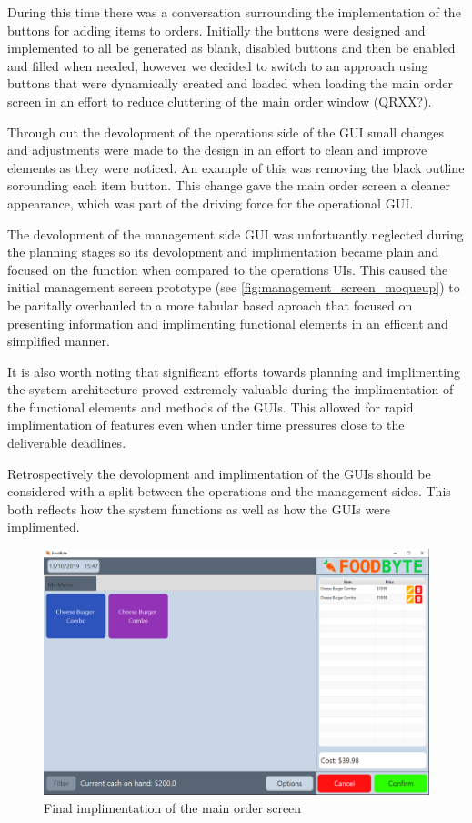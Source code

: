 During this time there was a conversation surrounding the implementation of the buttons for adding items to orders. Initially the buttons were designed and implemented to all be generated as blank, disabled buttons and then be enabled and filled when needed, however we decided to switch to an approach using buttons that were dynamically created and loaded when loading the main order screen in an effort to reduce cluttering of the main order window (QRXX?).

Through out the devolopment of the operations side of the GUI small changes and adjustments were made to the design in an effort to clean and improve elements as they were noticed. An example of this was removing the black outline sorounding each item button. This change gave the main order screen a cleaner appearance, which was part of the driving force for the operational GUI.

The devolopment of the management side GUI was unfortuantly neglected during the planning stages so its devolopment and implimentation became plain and focused on the function when compared to the operations UIs. This caused the initial management screen prototype (see \ref{fig:management_screen_moqueup}) to be paritally overhauled to a more tabular based aproach that focused on presenting information and implimenting functional elements in an efficent and simplified manner.

It is also worth noting that significant efforts towards planning and implimenting the system architecture proved extremely valuable during the implimentation of the functional elements and methods of the GUIs. This allowed for rapid implimentation of features even when under time pressures close to the deliverable deadlines.

Retrospectively the devolopment and implimentation of the GUIs should be considered with a split between the operations and the management sides. This both reflects how the system functions as well as how the GUIs were implimented. 

\begin{figure}[ht]
	\centering
	\includegraphics[width=150mm]{images/Final_GUI/main_order_screen.png}
	\caption{Final implimentation of the main order screen}
	\label{fig:final_order_screen}
\end{figure}

